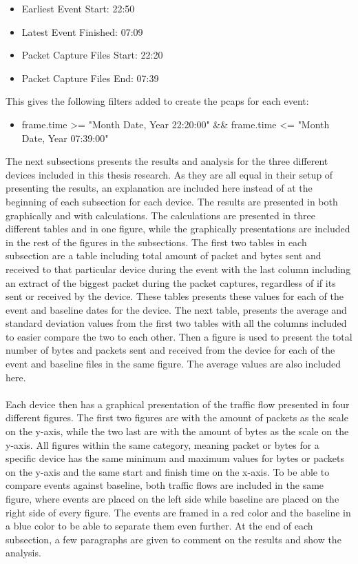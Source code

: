 \begin{itemize}
    \item Earliest Event Start: 22:50
    \item Latest Event Finished: 07:09
    \item Packet Capture Files Start: 22:20
    \item Packet Capture Files End: 07:39
\end{itemize}

This gives the following filters added to create the pcaps for each event:
\begin{itemize}
    \item frame.time >= "Month Date, Year 22:20:00" && frame.time <= "Month Date, Year 07:39:00"
\end{itemize}

The next subsections presents the results and analysis for the three different devices included in this thesis research. As they are all equal in their setup of presenting the results, an explanation are included here instead of at the beginning of each subsection for each device. The results are presented in both graphically and with calculations. The calculations are presented in three different tables and in one figure, while the graphically presentations are included in the rest of the figures in the subsections. The first two tables in each subsection are a table including total amount of packet and bytes sent and received to that particular device during the event with the last column including an extract of the biggest packet during the packet captures, regardless of if its sent or received by the device. These tables presents these values for each of the event and baseline dates for the device. The next table, presents the average and standard deviation values from the first two tables with all the columns included to easier compare the two to each other. Then a figure is used to present the total number of bytes and packets sent and received from the device for each of the event and baseline files in the same figure. The average values are also included here. 
\\\\
Each device then has a graphical presentation of the traffic flow presented in four different figures. The first two figures are with the amount of packets as the scale on the y-axis, while the two last are with the amount of bytes as the scale on the y-axis. All figures within the same category, meaning packet or bytes for a specific device has the same minimum and maximum values for bytes or packets on the y-axis and the same start and finish time on the x-axis. To be able to compare events against baseline, both traffic flows are included in the same figure, where events are placed on the left side while baseline are placed on the right side of every figure. The events are framed in a red color and the baseline in a blue color to be able to separate them even further. At the end of each subsection, a few paragraphs are given to comment on the results and show the analysis. 

